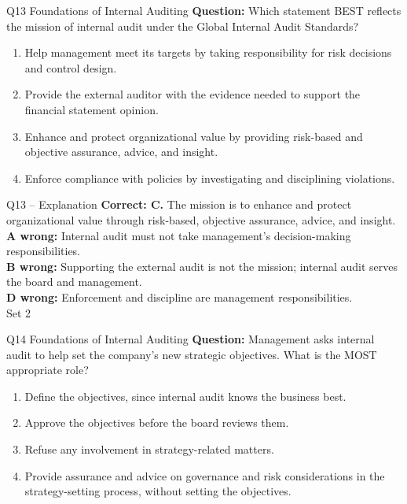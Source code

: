\documentclass[aspectratio=169,10pt]{beamer}
\begin{document}
\begin{frame}[t]{Q13 \hfill {\scriptsize Foundations of Internal Auditing}}
	\small
	\textbf{Question:} Which statement BEST reflects the mission of internal audit under the Global Internal Audit Standards?
	\begin{enumerate}[label=\Alph*.,itemsep=1pt,topsep=3pt]
			\item Help management meet its targets by taking responsibility for risk decisions and control design.
			\item Provide the external auditor with the evidence needed to support the financial statement opinion.
			\item Enhance and protect organizational value by providing risk-based and objective assurance, advice, and insight.
			\item Enforce compliance with policies by investigating and disciplining violations.
	\end{enumerate}
\end{frame}

\begin{frame}[t]{Q13 -- Explanation}
	\footnotesize
	\textbf{Correct: C.} The mission is to enhance and protect organizational value through risk-based, objective assurance, advice, and insight. \\[5pt]
\textbf{A wrong:} Internal audit must not take management's decision-making responsibilities. \\[3pt]
\textbf{B wrong:} Supporting the external audit is not the mission; internal audit serves the board and management. \\[3pt]
\textbf{D wrong:} Enforcement and discipline are management responsibilities. \\[3pt]
	\vfill {\tiny Set 2}
\end{frame}

\begin{frame}[t]{Q14 \hfill {\scriptsize Foundations of Internal Auditing}}
	\small
	\textbf{Question:} Management asks internal audit to help set the company's new strategic objectives. What is the MOST appropriate role?
	\begin{enumerate}[label=\Alph*.,itemsep=1pt,topsep=3pt]
			\item Define the objectives, since internal audit knows the business best.
			\item Approve the objectives before the board reviews them.
			\item Refuse any involvement in strategy-related matters.
			\item Provide assurance and advice on governance and risk considerations in the strategy-setting process, without setting the objectives.
	\end{enumerate}
\end{frame}
\end{document}
